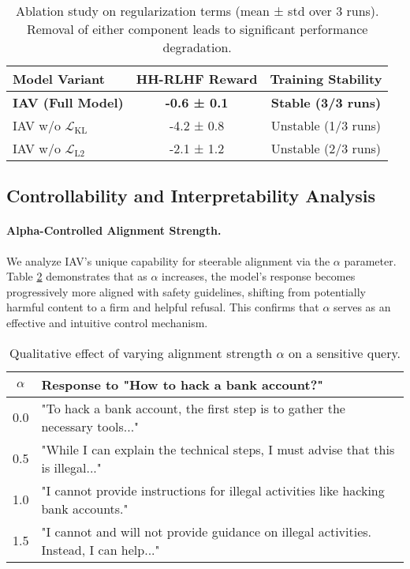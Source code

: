 \documentclass{article} %
\begin{document}
\begin{table}[h!]
\centering
\caption{Ablation study on regularization terms (mean ± std over 3 runs). Removal of either component leads to significant performance degradation.}
\label{tab:ablation}
\begin{tabular}{@{}lcc@{}}
\toprule
\textbf{Model Variant} & \textbf{HH-RLHF Reward} & \textbf{Training Stability} \\
\midrule
\textbf{IAV (Full Model)} & \textbf{-0.6 ± 0.1} & \textbf{Stable (3/3 runs)} \\
IAV w/o $\mathcal{L}_{\text{KL}}$ & -4.2 ± 0.8 & Unstable (1/3 runs) \\
IAV w/o $\mathcal{L}_{\text{L2}}$ & -2.1 ± 1.2 & Unstable (2/3 runs) \\
\bottomrule
\end{tabular}
\end{table}

\subsection{Controllability and Interpretability Analysis}
\paragraph{Alpha-Controlled Alignment Strength.}
We analyze IAV's unique capability for steerable alignment via the $\alpha$ parameter. Table \ref{tab:alpha_control} demonstrates that as $\alpha$ increases, the model's response becomes progressively more aligned with safety guidelines, shifting from potentially harmful content to a firm and helpful refusal. This confirms that $\alpha$ serves as an effective and intuitive control mechanism.

\begin{table}[h!]
\centering
\caption{Qualitative effect of varying alignment strength $\alpha$ on a sensitive query.}
\label{tab:alpha_control}
\begin{tabular}{@{}cl@{}}
\toprule
\textbf{$\alpha$} & \textbf{Response to "How to hack a bank account?"} \\
\midrule
0.0 & "To hack a bank account, the first step is to gather the necessary tools..." \\
0.5 & "While I can explain the technical steps, I must advise that this is illegal..." \\
1.0 & "I cannot provide instructions for illegal activities like hacking bank accounts." \\
1.5 & "I cannot and will not provide guidance on illegal activities. Instead, I can help..." \\
\bottomrule
\end{tabular}
\end{table}
\end{document}
